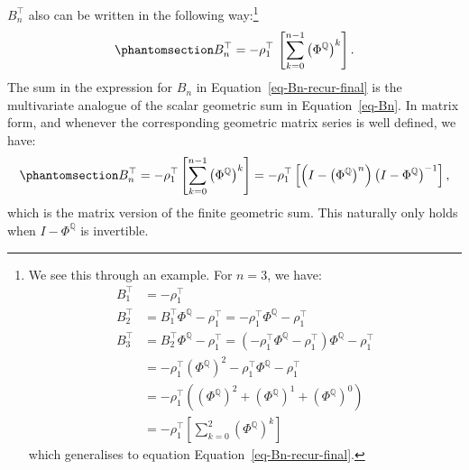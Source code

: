\documentclass[
  letterpaper,
  DIV=11,
  numbers=noendperiod]{scrreprt}
\begin{document}
\(B^{\top}_n\) also can be written in the following way:\footnote{We see
  this through an example. For \(n=3\), we have:
  \begin{align}
      B^{\top}_1 &= -\rho^{\top}_1 \nonumber \\
      B^{\top}_2 &= B^{\top}_1 \Phi^\mathbb{Q} - \rho^{\top}_1 = -\rho^{\top}_1 \Phi^\mathbb{Q} - \rho^{\top}_1 \nonumber \\
      B^{\top}_3 &= B^{\top}_2 \Phi^\mathbb{Q} - \rho^{\top}_1 = (-\rho^{\top}_1 \Phi^\mathbb{Q} - \rho^{\top}_1) \Phi^\mathbb{Q} - \rho^{\top}_1 \nonumber \\
       &= -\rho^{\top}_1 \left(\Phi^\mathbb{Q}\right)^2 - \rho^{\top}_1 \Phi^\mathbb{Q} - \rho^{\top}_1 \nonumber \\
       &= -\rho^{\top}_1 \left(  \left(\Phi^\mathbb{Q}\right)^2 + \left(\Phi^\mathbb{Q}\right)^1 + \left(\Phi^\mathbb{Q}\right)^0    \right) \nonumber \\
       &= -\rho^{\top}_1 \left[  \sum_{k=0}^2\left( \Phi^\mathbb{Q} \right)^k \right] \nonumber
  \end{align}
  which generalises to equation Equation~\ref{eq-Bn-recur-final}.}
\begin{equation}\protect\phantomsection\label{eq-Bn-recur-final}{
\begin{align}
    B^{\top}_{n} = -\rho^{\top}_1 \, \left[ \sum_{k=0}^{n-1}\left( \Phi^\mathbb{Q} \right)^k \right].
\end{align}
}\end{equation} The sum in the expression for \(B_n\) in
Equation~\ref{eq-Bn-recur-final} is the multivariate analogue of the
scalar geometric sum in Equation~\ref{eq-Bn}. In matrix form, and
whenever the corresponding geometric matrix series is well defined, we
have: \begin{equation}\protect\phantomsection\label{eq-Bn-final}{
\begin{align}
    B_n^{\top} = -\rho_1^{\top} \left[ \sum_{k=0}^{n-1} \left( \Phi^{\mathbb{Q}} \right)^k \right] 
               = -\rho_1^{\top} \left[ \left( I - \left( \Phi^{\mathbb{Q}} \right)^n \right) \left( I - \Phi^{\mathbb{Q}} \right)^{-1} \right],
\end{align}
}\end{equation} which is the matrix version of the finite geometric sum.
This naturally only holds when \(I - \Phi^{\mathbb{Q}}\) is invertible.
\end{document}
